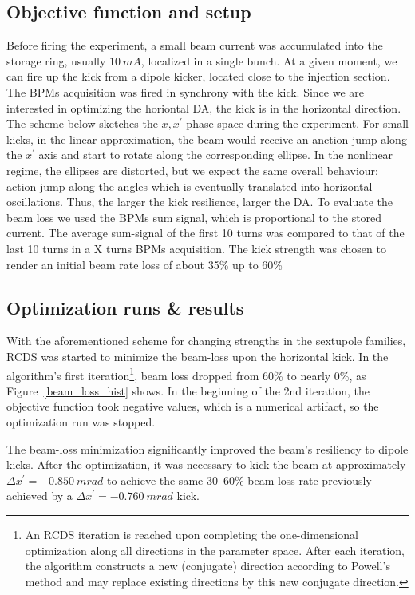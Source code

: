 \subsection{Objective function and setup}
Before firing the experiment, a small beam current was accumulated into the storage ring, usually $10~\unit{mA}$, localized in a single bunch. At a given moment, we can fire up the kick from a dipole kicker, located close to the injection section. The BPMs acquisition was fired in synchrony with the kick. Since we are interested in optimizing the horiontal DA, the kick is in the horizontal direction. The scheme below sketches the $x,x^\prime$ phase space during the experiment. For small kicks, in the linear approximation, the beam would receive an anction-jump along the $x^\prime$ axis and start to rotate along the corresponding ellipse. In the nonlinear regime, the ellipses are distorted, but we expect the same overall behaviour: action jump along the angles which is eventually translated into horizontal oscillations. Thus, the larger the kick resilience, larger the DA.
To evaluate the beam loss we used the BPMs sum signal, which is proportional to the stored current. The average sum-signal of the first 10 turns was compared to that of the last 10 turns in a X turns BPMs acquisition. The kick strength was chosen to render an initial beam rate loss of about 35\% up to 60\%
\subsection{Optimization runs \& results}
With the aforementioned scheme for changing strengths in the sextupole families, RCDS was started to minimize the beam-loss upon the horizontal kick. In the algorithm's first iteration\footnote{An RCDS iteration is reached upon completing the one-dimensional optimization along all directions in the parameter space. After each iteration, the algorithm constructs a new (conjugate) direction according to Powell's method and may replace existing directions by this new conjugate direction.}, beam loss dropped from 60\% to nearly 0\%, as Figure~\ref{beam_loss_hist} shows. In the beginning of the 2nd iteration, the objective function took negative values, which is a numerical artifact, so the optimization run was stopped.

The beam-loss minimization significantly improved the beam's resiliency to dipole kicks. After the optimization, it was necessary to kick the beam at approximately $\Delta x^\prime=-0.850~\unit{m rad}$ to achieve the same  30--60\% beam-loss rate previously achieved by a $\Delta x^\prime=-0.760~\unit{m rad}$ kick.

